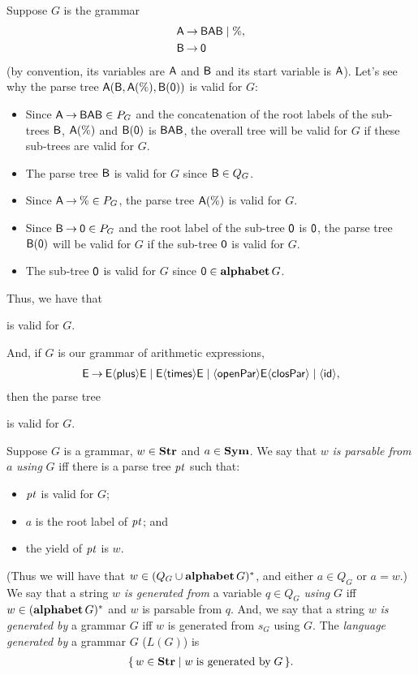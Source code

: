 Suppose $G$ is the grammar
\begin{align*}
\mathsf{A} &\mathbin{\to} \mathsf{B}\mathsf{A}\mathsf{B} \mid \% , \\
\mathsf{B} &\mathbin{\to} \mathsf{0} 
\end{align*}
(by convention, its variables are $\mathsf{A}$ and $\mathsf{B}$ and its
start variable is $\mathsf{A}$).
Let's see why the parse tree $\mathsf{A}(\mathsf{B},\mathsf{A}(\%),\mathsf{B}(\mathsf{0}))$ is
valid for $G$:
\begin{itemize}
\item Since $\mathsf{A}\mathbin{\to}\mathsf{B}\mathsf{A}\mathsf{B}\in P_G$ and the concatenation
of the root labels of the sub-trees
$\mathsf{B}$, $\mathsf{A}(\%)$ and $\mathsf{B}(\mathsf{0})$ is $\mathsf{B}\mathsf{A}\mathsf{B}$,
the overall tree will be valid for $G$ if these sub-trees are valid
for $G$.

\item The parse tree $\mathsf{B}$ is valid for $G$
since $\mathsf{B}\in Q_G$.

\item Since $\mathsf{A}\mathbin{\to}\%\in P_G$, the parse tree
$\mathsf{A}(\%)$ is valid for $G$.

\item Since $\mathsf{B}\mathbin{\to}\mathsf{0}\in P_G$ and the root label of the sub-tree
$\mathsf{0}$ is $\mathsf{0}$, the parse tree
$\mathsf{B}(\mathsf{0})$ will be valid for $G$ if the sub-tree $\mathsf{0}$
is valid for $G$.

\item The sub-tree $\mathsf{0}$ is valid for $G$ since
  $\mathsf{0}\in\mathbf{alphabet}\,G$.
\end{itemize}
Thus, we have that
\begin{center}

\end{center}
is valid for $G$.

And, if $G$ is our grammar of arithmetic expressions,
\begin{gather*}
\mathsf{E\mathbin{\to} E{\langle\mathsf{plus}\rangle} E\mid E{\langle\mathsf{times}\rangle} E\mid {\langle\mathsf{openPar}\rangle} E{\langle\mathsf{closPar}\rangle} \mid
{\langle\mathsf{id}\rangle}} ,
\end{gather*}
then the parse tree
\begin{center}

\end{center}
is valid for $G$.

Suppose $G$ is a grammar, $w\in\mathbf{Str}$ and $a\in\mathbf{Sym}$.  We say that $w$
\emph{is parsable from} $a$ \emph{using} $G$ iff there is a parse tree
${\it pt}$ such that:
\begin{itemize}
\item ${\it pt}$ is valid for $G$;

\item $a$ is the root label of ${\it pt}$; and

\item the yield of ${\it pt}$ is $w$.
\end{itemize}
(Thus we will have that $w\in(Q_G\cup\mathbf{alphabet}\,G)^*$, and either
$a\in Q_G$ or $a = w$.)
We say that a string $w$ \emph{is generated from} a variable $q\in Q_G$
\emph{using} $G$ iff $w\in(\mathbf{alphabet}\,G)^*$ and $w$ is parsable from
$q$.
And, we say that a string $w$ \emph{is generated by} a grammar $G$ iff
$w$ is generated from $s_G$ using $G$.
The \emph{language generated by} a grammar $G$ ($L(G)$) is
\begin{gather*}
\{ \, w\in\mathbf{Str} \mid w\;\allowbreak\mbox{is generated by}\allowbreak\;G \, \}.
\end{gather*}

